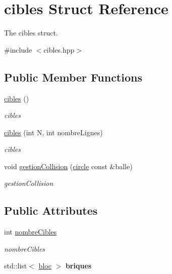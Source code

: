 \hypertarget{structcibles}{\section{cibles Struct Reference}
\label{structcibles}
}


The cibles struct.  




{\ttfamily \#include $<$cibles.\-hpp$>$}

\subsection*{Public Member Functions}
\begin{DoxyCompactItemize}
\item 
\hypertarget{structcibles_aff3b848ce81ad0ce76482844a6ad3ac1}{\hyperlink{structcibles_aff3b848ce81ad0ce76482844a6ad3ac1}{cibles} ()}\label{structcibles_aff3b848ce81ad0ce76482844a6ad3ac1}

\begin{DoxyCompactList}\small\item\em cibles \end{DoxyCompactList}\item 
\hyperlink{structcibles_ae0e206ba4f2a00b82d3a6cdf1bbe61ea}{cibles} (int N, int nombre\-Lignes)
\begin{DoxyCompactList}\small\item\em cibles \end{DoxyCompactList}\item 
void \hyperlink{structcibles_a361b3e39738fcc849de170d392a65b6c}{gestion\-Collision} (\hyperlink{structcircle}{circle} const \&balle)
\begin{DoxyCompactList}\small\item\em gestion\-Collision \end{DoxyCompactList}\end{DoxyCompactItemize}
\subsection*{Public Attributes}
\begin{DoxyCompactItemize}
\item 
\hypertarget{structcibles_a5882b203001202b7cf98bb57f54638d5}{int \hyperlink{structcibles_a5882b203001202b7cf98bb57f54638d5}{nombre\-Cibles}}\label{structcibles_a5882b203001202b7cf98bb57f54638d5}

\begin{DoxyCompactList}\small\item\em nombre\-Cibles \end{DoxyCompactList}\item 
\hypertarget{structcibles_ac5061cda0bf0b1709c149b55f79f8eec}{std\-::list$<$ \hyperlink{structbloc}{bloc} $>$ {\bfseries briques}}\label{structcibles_ac5061cda0bf0b1709c149b55f79f8eec}

\end{DoxyCompactItemize}


